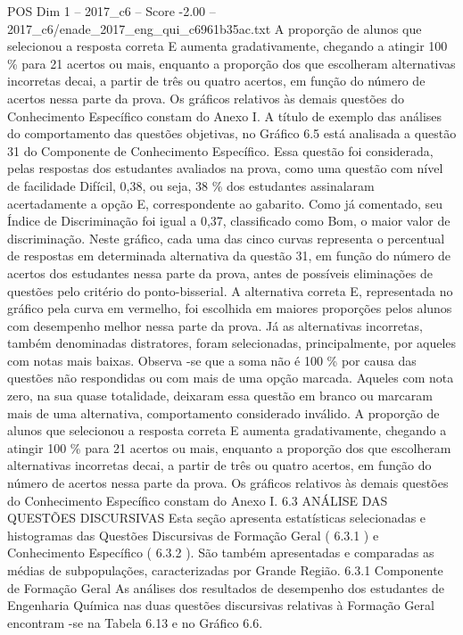 \begin{textsample}{POS Dim 1 – 2017\_c6 – Score -2.00 – 2017\_c6/enade\_2017\_eng\_qui\_c6961b35ac.txt}
A proporção de alunos que selecionou a resposta correta E aumenta gradativamente, chegando a atingir 100 \% para 21 acertos ou mais, enquanto a proporção dos que escolheram alternativas incorretas decai, a partir de três ou quatro acertos, em função do número de acertos nessa parte da prova.
Os gráficos relativos às demais questões do Conhecimento Específico constam do Anexo I.
A título de exemplo das análises do comportamento das questões objetivas, no Gráfico 6.5 está analisada a questão 31 do Componente de Conhecimento Específico.
Essa questão foi considerada, pelas respostas dos estudantes avaliados na prova, como uma questão com nível de facilidade Difícil, 0,38, ou seja, 38 \% dos estudantes assinalaram acertadamente a opção E, correspondente ao gabarito.
Como já comentado, seu Índice de Discriminação foi igual a 0,37, classificado como Bom, o maior valor de discriminação.
Neste gráfico, cada uma das cinco curvas representa o percentual de respostas em determinada alternativa da questão 31, em função do número de acertos dos estudantes nessa parte da prova, antes de possíveis eliminações de questões pelo critério do ponto-bisserial.
A alternativa correta E, representada no gráfico pela curva em vermelho, foi escolhida em maiores proporções pelos alunos com desempenho melhor nessa parte da prova.
Já as alternativas incorretas, também denominadas distratores, foram selecionadas, principalmente, por aqueles com notas mais baixas.
Observa -se que a soma não é 100 \% por causa das questões não respondidas ou com mais de uma opção marcada.
Aqueles com nota zero, na sua quase totalidade, deixaram essa questão em branco ou marcaram mais de uma alternativa, comportamento considerado inválido.
A proporção de alunos que selecionou a resposta correta E aumenta gradativamente, chegando a atingir 100 \% para 21 acertos ou mais, enquanto a proporção dos que escolheram alternativas incorretas decai, a partir de três ou quatro acertos, em função do número de acertos nessa parte da prova.
Os gráficos relativos às demais questões do Conhecimento Específico constam do Anexo I. 6.3 ANÁLISE DAS QUESTÕES DISCURSIVAS Esta seção apresenta estatísticas selecionadas e histogramas das Questões Discursivas de Formação Geral ( 6.3.1 ) e Conhecimento Específico ( 6.3.2 ).
São também apresentadas e comparadas as médias de subpopulações, caracterizadas por Grande Região. 6.3.1 Componente de Formação Geral As análises dos resultados de desempenho dos estudantes de Engenharia Química nas duas questões discursivas relativas à Formação Geral encontram -se na Tabela 6.13 e no Gráfico 6.6.

\end{textsample}
